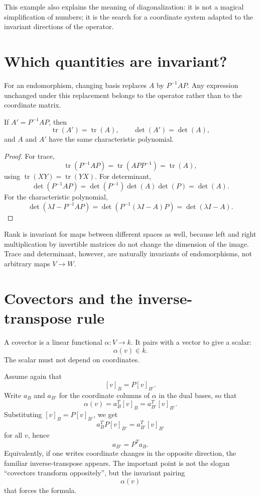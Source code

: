 This example also explains the meaning of diagonalization: it is not a magical simplification of numbers; it is the search for a coordinate system adapted to the invariant directions of the operator.

\section{Which quantities are invariant?}

For an endomorphism, changing basis replaces \(A\) by \(P^{-1}AP\).  Any expression unchanged under this replacement belongs to the operator rather than to the coordinate matrix.

\begin{proposition}
If \(A'=P^{-1}AP\), then
\[
  \operatorname{tr}(A')=\operatorname{tr}(A),\qquad
  \det(A')=\det(A),
\]
and \(A\) and \(A'\) have the same characteristic polynomial.
\end{proposition}

\begin{proof}
For trace,
\[
  \operatorname{tr}(P^{-1}AP)
  =\operatorname{tr}(APP^{-1})
  =\operatorname{tr}(A),
\]
using \(\operatorname{tr}(XY)=\operatorname{tr}(YX)\).  For determinant,
\[
  \det(P^{-1}AP)=\det(P^{-1})\det(A)\det(P)=\det(A).
\]
For the characteristic polynomial,
\[
  \det(\lambda I-P^{-1}AP)
  =\det(P^{-1}(\lambda I-A)P)
  =\det(\lambda I-A).
\]
\end{proof}

Rank is invariant for maps between different spaces as well, because left and right multiplication by invertible matrices do not change the dimension of the image.  Trace and determinant, however, are naturally invariants of endomorphisms, not arbitrary maps \(V\to W\).

\section{Covectors and the inverse-transpose rule}

A covector is a linear functional \(\alpha:V\to k\).  It pairs with a vector to give a scalar:
\[
  \alpha(v)\in k.
\]
The scalar must not depend on coordinates.

Assume again that
\[
  [v]_B=P[v]_{B'}.
\]
Write \(a_B\) and \(a_{B'}\) for the coordinate columns of \(\alpha\) in the dual bases, so that
\[
  \alpha(v)=a_B^T[v]_B=a_{B'}^T[v]_{B'}.
\]
Substituting \([v]_B=P[v]_{B'}\), we get
\[
  a_B^TP[v]_{B'}=a_{B'}^T[v]_{B'}
\]
for all \(v\), hence
\[
  a_{B'}=P^Ta_B.
\]
Equivalently, if one writes coordinate changes in the opposite direction, the familiar inverse-transpose appears.  The important point is not the slogan ``covectors transform oppositely'', but the invariant pairing
\[
  \alpha(v)
\]
that forces the formula.

